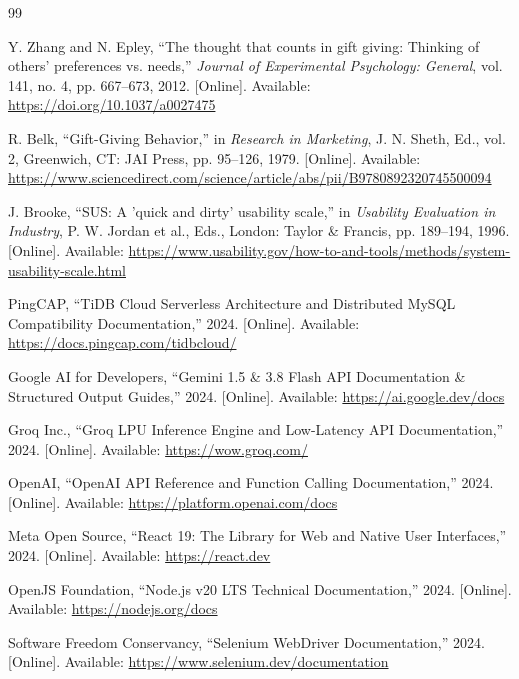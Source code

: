 \documentclass[12pt,a4paper]{report}
\begin{document}
\begin{thebibliography}{99}

Y. Zhang and N. Epley, 
``The thought that counts in gift giving: Thinking of others' preferences vs. needs,'' 
\textit{Journal of Experimental Psychology: General}, vol. 141, no. 4, pp. 667--673, 2012. 
[Online]. Available: \url{https://doi.org/10.1037/a0027475}

R. Belk, 
``Gift-Giving Behavior,'' 
in \textit{Research in Marketing}, J. N. Sheth, Ed., vol. 2, Greenwich, CT: JAI Press, pp. 95--126, 1979. 
[Online]. Available: \url{https://www.sciencedirect.com/science/article/abs/pii/B9780892320745500094}


J. Brooke, 
``SUS: A 'quick and dirty' usability scale,'' 
in \textit{Usability Evaluation in Industry}, P. W. Jordan et al., Eds., London: Taylor \& Francis, pp. 189--194, 1996. 
[Online]. Available: \url{https://www.usability.gov/how-to-and-tools/methods/system-usability-scale.html}


PingCAP, 
``TiDB Cloud Serverless Architecture and Distributed MySQL Compatibility Documentation,'' 
2024. [Online]. Available: \url{https://docs.pingcap.com/tidbcloud/}

Google AI for Developers, 
``Gemini 1.5 \& 3.8 Flash API Documentation \& Structured Output Guides,'' 
2024. [Online]. Available: \url{https://ai.google.dev/docs}

Groq Inc., 
``Groq LPU Inference Engine and Low-Latency API Documentation,'' 
2024. [Online]. Available: \url{https://wow.groq.com/}

OpenAI, 
``OpenAI API Reference and Function Calling Documentation,'' 
2024. [Online]. Available: \url{https://platform.openai.com/docs}

Meta Open Source, 
``React 19: The Library for Web and Native User Interfaces,'' 
2024. [Online]. Available: \url{https://react.dev}

OpenJS Foundation, 
``Node.js v20 LTS Technical Documentation,'' 
2024. [Online]. Available: \url{https://nodejs.org/docs}

Software Freedom Conservancy, 
``Selenium WebDriver Documentation,'' 
2024. [Online]. Available: \url{https://www.selenium.dev/documentation}

\end{thebibliography}

\end{document}
